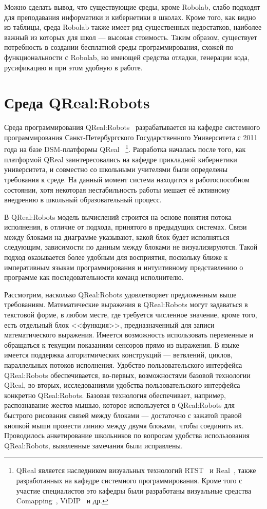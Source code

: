 \documentclass[a4paper]{article}
\begin{document}
Можно сделать вывод, что существующие среды, кроме Robolab, слабо подходят для преподавания информатики и кибернетики в школах. Кроме того, как видно из таблицы, среда Robolab также имеет ряд существенных недостатков, наиболее важный из которых для школ --- высокая стоимость. Таким образом, существует потребность в создании бесплатной среды программирования, схожей по функциональности с Robolab, но имеющей средства отладки, генерации кода, русификацию и при этом удобную в работе.

\section{Среда QReal:Robots}
Среда программирования QReal:Robots~\cite{robots} разрабатывается на кафедре системного программирования Санкт-Петербургского Государственного Университета с 2011 года на базе DSM-платформы QReal~\cite{qReal} {\footnote {QReal является наследником визуальных технологий RTST~\cite{rtst} и Real~\cite{real}, также разработанных на кафедре системного программирования. Кроме того с участие специалистов это кафедры были разработаны визуальные средства Comapping~\cite{comapping}, ViDIP~\cite{viDip} и др.}}. Разработка началась после того, как платформой QReal заинтересовались на кафедре прикладной кибернетики университета, и совместно со школьными учителями были определены требования к среде. На данный момент система находится в работоспособном состоянии, хотя некоторая нестабильность работы мешает её активному внедрению в школьный образовательный процесс.

В QReal:Robots модель вычислений строится на основе понятия потока исполнения, в отличие от подхода, принятого в предыдущих системах. Связи между блоками на диаграмме указывают, какой блок будет исполняться следующим, зависимости по данным между блоками не визуализируются. Такой подход оказывается более удобным для восприятия, поскольку ближе к императивным языкам программирования и интуитивному представлению о программе как последовательности команд исполнителю. 

Рассмотрим, насколько QReal:Robots удовлетворяет предложенным выше требованиям. Математические выражения в QReal:Robots могут задаваться в текстовой форме, в любом месте, где требуется численное значение, кроме того, есть отдельный блок <<функция>>, предназначенный для записи математического выражения. Имеется возможность использовать переменные и обращаться к текущим показаниям сенсоров прямо из выражения. В языке имеется поддержка алгоритмических конструкций --- ветвлений, циклов, параллельных потоков исполнения. Удобство пользовательского интерфейса QReal:Robots обеспечивается, во-первых, возможностями базовой технологии QReal, во-вторых, исследованиями удобства пользовательского интерфейса конкретно QReal:Robots. Базовая технология обеспечивает, например, распознавание жестов мышью, которое используется в QReal:Robots для быстрого рисования связей между блоками --- достаточно с зажатой правой кнопкой мыши провести линию между двумя блоками, чтобы соединить их. Проводилось анкетирование школьников по вопросам удобства использования QReal:Robots, выявленные замечания были исправлены.
\end{document}
